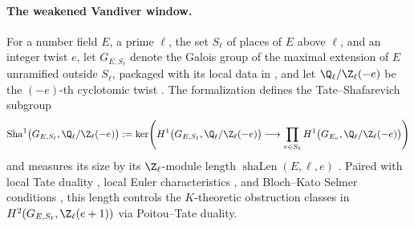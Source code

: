 \paragraph{The weakened Vandiver window.}
For a number field $E$, a prime $\ell$, the set $S_\ell$ of places of $E$ above
$\ell$, and an integer twist $e$, let $G_{E, S_\ell}$ denote the Galois group
of the maximal extension of $E$ unramified outside $S_\ell$, packaged with its
local data in , and let
$\Q_\ell/\Z_\ell(-e)$ be the $(-e)$-th cyclotomic twist
. The formalization defines the
Tate--Shafarevich subgroup
\[
  \operatorname{Sha}^1\bigl(G_{E, S_\ell}, \Q_\ell/\Z_\ell(-e)\bigr)
  := \ker\!\left(
    H^1\bigl(G_{E, S_\ell}, \Q_\ell/\Z_\ell(-e)\bigr)
    \longrightarrow \prod_{v \in S_\ell} H^1\bigl(G_{E_v}, \Q_\ell/\Z_\ell(-e)\bigr)
  \right)
\]
 and measures its size by its
$\Z_\ell$-module length $\operatorname{shaLen}(E, \ell, e)$
. Paired with local Tate duality
, local Euler
characteristics , and
Bloch--Kato Selmer conditions 
, this length controls the
$K$-theoretic obstruction classes in $H^2(G_{E, S_\ell}, \Z_\ell(e+1))$ via
Poitou--Tate duality.

